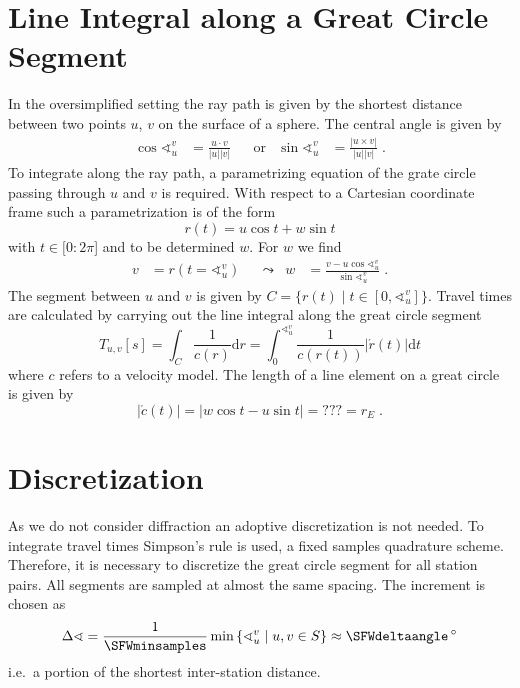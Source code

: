 \documentclass[11pt]{article}
\begin{document}
\section{Line Integral along a Great Circle Segment}
In the oversimplified setting the ray path is given by the shortest distance between two points $u$, $v$ on the surface of a sphere.
The central angle is given by
\begin{align}
    \cos \sphericalangle_u^v &= \frac{u \cdot v}{|u||v|} &
    &\text{or}&
    \sin \sphericalangle_u^v &= \frac{|u \times v|}{|u||v|}
    \; .
\end{align}
To integrate along the ray path, a parametrizing equation of the grate circle passing through $u$ and $v$ is required.
With respect to a Cartesian coordinate frame such a parametrization is of the form
\begin{equation}
    r(t) = u \cos t + w \sin t
\end{equation}
with $t \in [0:2\pi$] and to be determined $w$.
For $w$ we find
\begin{align}
    v &= r(t = \sphericalangle_u^v) &
    &\leadsto &
    w &= \frac{v - u \cos \sphericalangle_u^v}{\sin \sphericalangle_u^v}
    \; .
\end{align}
The segment between $u$ and $v$ is given by $C= \{r(t) \mid t \in [0, \sphericalangle_u^v]\}$.
Travel times are calculated by carrying out the line integral along the great circle segment
\begin{equation}
    T_{u,v}[s]
    = \int_C \frac1{c(r)} \mathrm d r
    = \int_0^{\sphericalangle_u^v} \frac 1{c(r(t))} |\acute r(t)| \mathrm d t
\end{equation}
where $c$ refers to a velocity model.
The length of a line element on a great circle is given by
\begin{equation}
    |\acute c(t)| = |w \cos t - u \sin t| = ??? = r_E
    \; .
\end{equation}


\section{Discretization}

As we do not consider diffraction an adoptive discretization is not needed.
To integrate travel times Simpson's rule is used, a fixed samples quadrature scheme.
Therefore, it is necessary to discretize the great circle segment for all station pairs.
All segments are sampled at almost the same spacing.
The increment is chosen as
\begin{equation}
    \Delta\sphericalangle = \frac 1 \SFWminsamples \min\left\{ \sphericalangle_u^v \mid u,v \in S \right\}
    \approx \SFWdeltaangle \,{}^\circ
\end{equation}
i.e.~a portion of the shortest inter-station distance.
\end{document}
